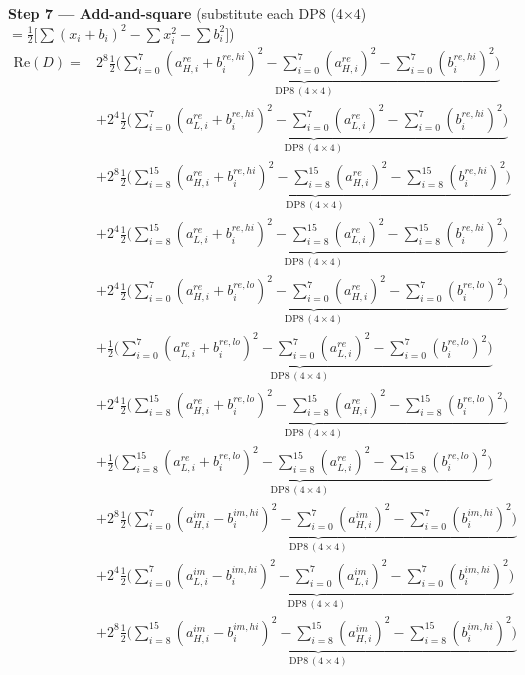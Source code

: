 \documentclass[fleqn]{article}
\newcommand{\DPop}[3]{\mathrm{DP#1}\,(#2\!\times\!#3)}
\begin{document}
\textbf{Step 7 --- Add-and-square}\quad
{\small(substitute each DP8 (4$\times$4) $= \tfrac{1}{2}\big[\sum(x_i{+}b_i)^2 - \sum x_i^2 - \sum b_i^2\big]$)}
\begin{align*}
\mathrm{Re}(D) = {}
  & 2^{8}\underbrace{\tfrac{1}{2}\Big(\sum_{i=0}^{7}(a_{H,i}^{re}{+}b_i^{re,hi})^2 - \sum_{i=0}^{7}(a_{H,i}^{re})^2 - \sum_{i=0}^{7}(b_i^{re,hi})^2\Big)}_{\DPop{8}{4}{4}} \\[0.7em]
  & + 2^{4}\underbrace{\tfrac{1}{2}\Big(\sum_{i=0}^{7}(a_{L,i}^{re}{+}b_i^{re,hi})^2 - \sum_{i=0}^{7}(a_{L,i}^{re})^2 - \sum_{i=0}^{7}(b_i^{re,hi})^2\Big)}_{\DPop{8}{4}{4}} \\[0.7em]
  & + 2^{8}\underbrace{\tfrac{1}{2}\Big(\sum_{i=8}^{15}(a_{H,i}^{re}{+}b_i^{re,hi})^2 - \sum_{i=8}^{15}(a_{H,i}^{re})^2 - \sum_{i=8}^{15}(b_i^{re,hi})^2\Big)}_{\DPop{8}{4}{4}} \\[0.7em]
  & + 2^{4}\underbrace{\tfrac{1}{2}\Big(\sum_{i=8}^{15}(a_{L,i}^{re}{+}b_i^{re,hi})^2 - \sum_{i=8}^{15}(a_{L,i}^{re})^2 - \sum_{i=8}^{15}(b_i^{re,hi})^2\Big)}_{\DPop{8}{4}{4}} \\[0.7em]
  & + 2^{4}\underbrace{\tfrac{1}{2}\Big(\sum_{i=0}^{7}(a_{H,i}^{re}{+}b_i^{re,lo})^2 - \sum_{i=0}^{7}(a_{H,i}^{re})^2 - \sum_{i=0}^{7}(b_i^{re,lo})^2\Big)}_{\DPop{8}{4}{4}} \\[0.7em]
  & + \underbrace{\tfrac{1}{2}\Big(\sum_{i=0}^{7}(a_{L,i}^{re}{+}b_i^{re,lo})^2 - \sum_{i=0}^{7}(a_{L,i}^{re})^2 - \sum_{i=0}^{7}(b_i^{re,lo})^2\Big)}_{\DPop{8}{4}{4}} \\[0.7em]
  & + 2^{4}\underbrace{\tfrac{1}{2}\Big(\sum_{i=8}^{15}(a_{H,i}^{re}{+}b_i^{re,lo})^2 - \sum_{i=8}^{15}(a_{H,i}^{re})^2 - \sum_{i=8}^{15}(b_i^{re,lo})^2\Big)}_{\DPop{8}{4}{4}} \\[0.7em]
  & + \underbrace{\tfrac{1}{2}\Big(\sum_{i=8}^{15}(a_{L,i}^{re}{+}b_i^{re,lo})^2 - \sum_{i=8}^{15}(a_{L,i}^{re})^2 - \sum_{i=8}^{15}(b_i^{re,lo})^2\Big)}_{\DPop{8}{4}{4}} \\[0.7em]
  & + 2^{8}\underbrace{\tfrac{1}{2}\Big(\sum_{i=0}^{7}(a_{H,i}^{im}{-}b_i^{im,hi})^2 - \sum_{i=0}^{7}(a_{H,i}^{im})^2 - \sum_{i=0}^{7}(b_i^{im,hi})^2\Big)}_{\DPop{8}{4}{4}} \\[0.7em]
  & + 2^{4}\underbrace{\tfrac{1}{2}\Big(\sum_{i=0}^{7}(a_{L,i}^{im}{-}b_i^{im,hi})^2 - \sum_{i=0}^{7}(a_{L,i}^{im})^2 - \sum_{i=0}^{7}(b_i^{im,hi})^2\Big)}_{\DPop{8}{4}{4}} \\[0.7em]
  & + 2^{8}\underbrace{\tfrac{1}{2}\Big(\sum_{i=8}^{15}(a_{H,i}^{im}{-}b_i^{im,hi})^2 - \sum_{i=8}^{15}(a_{H,i}^{im})^2 - \sum_{i=8}^{15}(b_i^{im,hi})^2\Big)}_{\DPop{8}{4}{4}} \\[0.7em]

\end{align*}
\end{document}
